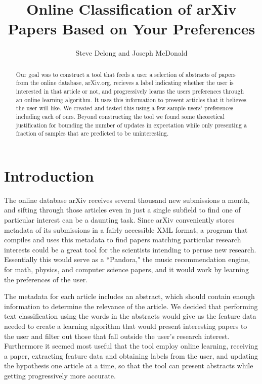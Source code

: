 \documentclass[12pt]{article}
\begin{document}
\title{Online Classification of arXiv Papers Based on Your Preferences}
\author{Steve Delong and Joseph McDonald}
\maketitle
\begin{abstract}
Our goal was to construct a tool that feeds a user a selection of abstracts of papers from the online database, arXiv.org, recieves a label indicating whether the user is interested in that article or not, and progressively learns the users preferences through an online learning algorithm. It uses this information to present articles that it believes the user will like. We created and tested this using a few sample users' preferences including each of ours. Beyond constructing the tool we found some theoretical justification for bounding the number of updates in expectation while only presenting a fraction of samples that are predicted to be uninteresting.
\end{abstract}

\section{Introduction}

The online database arXiv receives several thousand new submissions a month, and sifting through those articles even in just a single subfield to find one of particular interest can be a daunting task. Since arXiv conveniently stores metadata of its submissions in a fairly accessible XML format, a program that compiles and uses this metadata to find papers matching particular research interests could be a great tool for the scientists intending to peruse new research. Essentially this would serve as a ``Pandora," the music recommendation engine, for math, physics, and computer science papers, and it would work by learning the preferences of the user.

The metadata for each article includes an abstract, which should contain enough information to determine the relevance of the article. We decided that performing text classification using the words in the abstracts would give us the feature data needed to create a learning algorithm that would present interesting papers to the user and filter out those that fall outside the user's research interest. Furthermore it seemed most useful that the tool employ online learning, receiving a paper, extracting feature data and obtaining labels from the user, and updating the hypothesis one article at a time, so that the tool can present abstracts while getting progressively more accurate.
\end{document}
